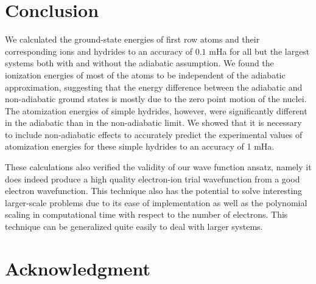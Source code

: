 \documentclass[pra,superscriptaddress,groupedaddress,twocolumn]{revtex4}
\begin{document}
\section{Conclusion}
We calculated the ground-state energies of first row atoms and their corresponding ions and hydrides to an accuracy of $0.1$ mHa for all but the largest systems both with and without the adiabatic assumption. We found the ionization energies of most of the atoms to be independent of the adiabatic approximation, suggesting that the energy difference between the adiabatic and non-adiabatic ground states is mostly due to the zero point motion of the nuclei. The atomization energies of simple hydrides, however, were significantly different in the adiabatic than in the non-adiabatic limit. We showed that it is necessary to include non-adiabatic effects to accurately predict the experimental values of atomization energies for these simple hydrides to an accuracy of 1 mHa.

These calculations also verified the validity of our wave function ansatz, namely it does indeed produce a high quality electron-ion trial wavefunction from a good electron wavefunction. This technique also has the potential to solve interesting larger-scale problems due to its ease of implementation as well as the polynomial scaling in computational time with respect to the number of electrons.  This technique can be generalized quite easily to deal with larger systems.

\section{Acknowledgment}



\end{document}
